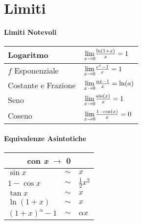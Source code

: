 \documentclass[12pt, a4paper, openany]{article}
\begin{document}
	\section*{Limiti}
	\begin{multicols}{2}
		\paragraph*{Limiti Notevoli}
		\columnbreak
		\begin{tabularx}{0.8\textwidth}{ |X|X| }
			\hline
			Logaritmo & $\underset{x \to 0}{\lim} \frac{\ln(1+x)}{x} = 1 $\\
			\hline
			$f$ Esponenziale & $\underset{x \to 0}{\lim} \frac{e^x-1}{x} = 1$\\
			\hline
			Costante e Frazione & $\underset{x \to 0}{\lim}\frac{ax -1}{x} = \ln(a)$\\
			\hline
			Seno & $\underset{x \to 0}{\lim}\frac{\sin(x)}{x} = 1$ \\
			\hline
			Coseno & $\underset{x \to 0}{\lim} \frac{1-\cos(x)}{x} = 0 $\\
			\hline
		\end{tabularx}
	\end{multicols}
	\begin{multicols}{2}
	\paragraph*{Equivalenze Asintotiche}
	\columnbreak
	\begin{tabularx}{0.67\textwidth}{|Xcl|}
		\hline
		\multicolumn{3}{|c|}{\textbf{con \emph{x} $\to$ 0}}\\
		\hline
		\hline
		$\sin x$ &$\sim$ & $x$ \\
		\hline
		$1-\cos x$&$\sim$ & $\frac{1}{2}x^2$\\
		\hline
		$\tan x$ & $\sim$ & $x$\\
		\hline
		$\ln(1+x)$ & $\sim$ & $x$ \\
		\hline
		$(1+x)^\alpha -1 $&$\sim$& $\alpha x$ \\
		\hline
	\end{tabularx}
\end{multicols}



\end{document}
